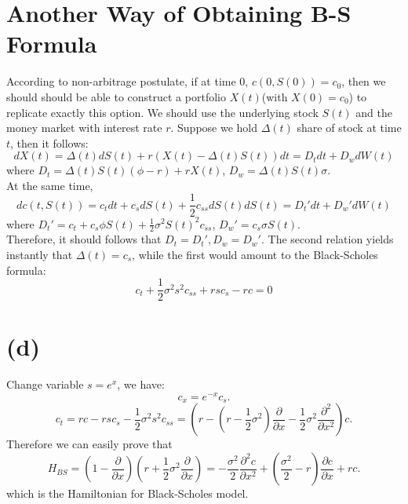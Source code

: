 \documentclass[12pt,a4paper]{paper}
\begin{document}
\section*{Another Way of Obtaining B-S Formula}
According to non-arbitrage postulate, if at time $0$, $c(0, S(0)) = c_0$, then we should should be able to construct a portfolio $X(t)$(with $X(0) = c_0$) to replicate exactly this option. We should use the underlying stock $S(t)$ and the money market with interest rate $r$. Suppose we hold $\Delta(t)$ share of stock at time $t$, then it follows:
\begin{equation}
dX(t) = \Delta(t)dS(t) + r(X(t) - \Delta(t)S(t))dt = D_tdt + D_w dW(t)
\end{equation}
where $D_t = \Delta(t)S(t)(\phi - r) + r X(t)$, $D_w = \Delta(t)S(t)\sigma$.\\
\indent At the same time,
\begin{equation}
dc(t, S(t)) = c_t dt + c_s dS(t) + \frac{1}{2} c_{ss} dS(t)dS(t) = D_t' dt + D_w'dW(t)
\end{equation}
where $D_t' = c_t + c_s \phi S(t) + \frac{1}{2}\sigma^2 S(t)^2c_{ss}$, $D_w' = c_s \sigma S(t)$. \\
\indent Therefore, it should follows that $D_t = D_t', D_w = D_w'$. The second relation yields instantly that $\Delta(t) = c_s$, while the first would amount to the Black-Scholes formula:
\begin{equation}
c_t + \frac{1}{2}\sigma^2 s^2 c_{ss} + rsc_s - rc = 0
\end{equation}

\section{(d)}
Change variable $s = e^x$, we have:
\begin{equation}
c_x = e^{-x}c_s.
\end{equation}
\begin{equation}
c_t = rc - rsc_s - \frac{1}{2}\sigma^2 s^2 c_{ss} = (r - (r - \frac{1}{2}\sigma^2)\frac{\partial}{\partial x} - \frac{1}{2}\sigma^2 \frac{\partial^2}{\partial x^2}) c.
\end{equation}
\indent Therefore we can easily prove that
\begin{equation} 
H_{BS} = (1 - \frac{\partial}{\partial x})(r + \frac{1}{2} \sigma^2 \frac{\partial}{\partial x})=-\frac{\sigma ^2}{2}\frac{\partial^2 c}{\partial x^2}+(\frac{\sigma ^2}{2}-r)\frac{\partial c}{\partial x}+rc. 
\end{equation}
which is the Hamiltonian for Black-Scholes model.
\end{document}

